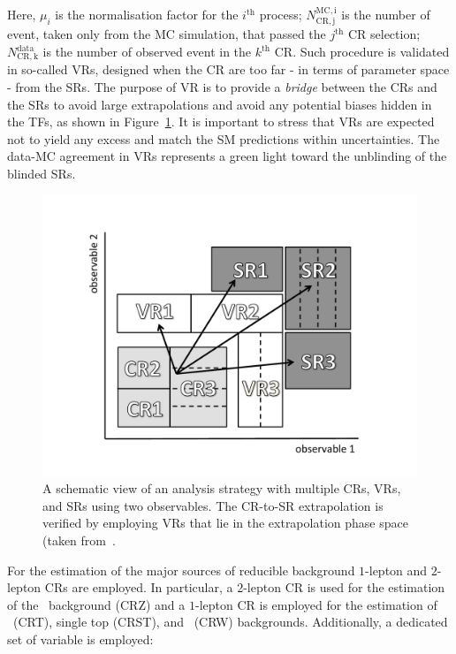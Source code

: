 		\noindent Here, $\mu_i$ is the normalisation factor for the $i^{\mathrm{th}}$ process; $N_{\mathrm{CR,j}}^{\mathrm{MC,i}}$ is the number of event, taken only from the \ac{MC} simulation, that passed the $j^{\mathrm{th}}$ CR selection; $N_{\mathrm{CR,k}}^{\mathrm{data}}$ is the number of observed event in the $k^{\mathrm{th}}$ \ac{CR}. Such procedure is validated in so-called \acp{VR}, designed when the \ac{CR} are too far - in terms of parameter space - from the \acp{SR}. The purpose of \ac{VR} is to provide a \emph{bridge} between the \acp{CR} and the \acp{SR} to avoid large extrapolations and avoid any potential biases hidden in the \acp{TF}, as shown in Figure~\ref{fig:extrapolation}. It is important to stress that \acp{VR} are expected not to yield any excess and match the \ac{SM} predictions within uncertainties. The data-\ac{MC} agreement in \acp{VR} represents a green light toward the unblinding of the blinded \acp{SR}.

		\begin{figure}[!htb]
		  \begin{center}
		   \includegraphics[width=\textwidth]{figures/stop/cartoon_CRVRSR_bw}
		   \caption{A schematic view of an analysis strategy with multiple \acp{CR}, \acp{VR}, and \acp{SR} using two observables. The \ac{CR}-to-\ac{SR} extrapolation is verified by employing \acp{VR} that lie in the extrapolation phase space (taken from~\cite{histfitter}.}
		   \label{fig:extrapolation}
		  \end{center}
		\end{figure}

		For the estimation of the major sources of reducible background $1$-lepton and $2$-lepton \acp{CR} are employed. In particular, a $2$-lepton \ac{CR} is used for the estimation of the \Zjets\ background (CRZ) and a $1$-lepton \ac{CR} is employed for the estimation of \ttbar\ (CRT), single top (CRST), and \Wjets\ (CRW) backgrounds. Additionally, a dedicated set of variable is employed:

